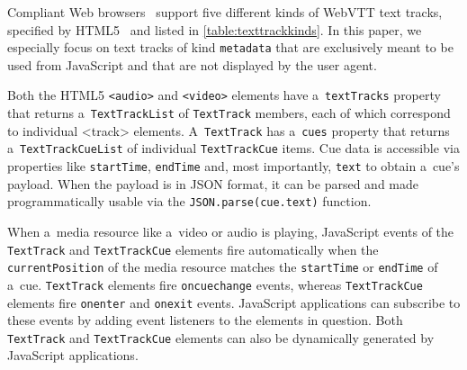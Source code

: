 \documentclass{sig-alternate}
\begin{document}
Compliant Web browsers~\cite{dutton2012trackelement}
support five different kinds of
WebVTT text tracks, specified by HTML5~\cite{berjon2013html5}
and listed in \autoref{table:texttrackkinds}.
In this paper, we especially focus on
text tracks of kind \texttt{metadata}
that are exclusively meant to be used from JavaScript and
that are not displayed by the user agent.

Both the HTML5 \texttt{<audio>} and \texttt{<video>} elements
have a~\texttt{textTracks} property
that returns a~\texttt{TextTrackList} of
\texttt{TextTrack} members, each of which correspond
to individual <track> elements.
A~\texttt{TextTrack} has a~\texttt{cues} property
that returns a~\texttt{TextTrackCueList} of individual
\texttt{TextTrackCue} items.
Cue data is accessible via properties like
\texttt{startTime}, \texttt{endTime} and,
most importantly, \texttt{text} to obtain a~cue's payload.
When the payload is in JSON format,
it can be parsed and made programmatically usable via the
\texttt{JSON.parse(cue.text)} function.

When a~media resource like a~video or audio is playing,
JavaScript events of the \texttt{TextTrack} and \texttt{TextTrackCue}
elements fire automatically when the \texttt{currentPosition}
of the media resource matches the
\texttt{startTime} or \texttt{endTime} of a~cue.
\texttt{TextTrack} elements fire \texttt{oncuechange} events,
whereas \texttt{TextTrackCue} elements fire
\texttt{onenter} and \texttt{onexit} events.
JavaScript applications can subscribe to these events
by adding event listeners to the elements in question.
Both \texttt{TextTrack} and \texttt{TextTrackCue} elements
can also be dynamically generated by JavaScript applications.

\end{document}
